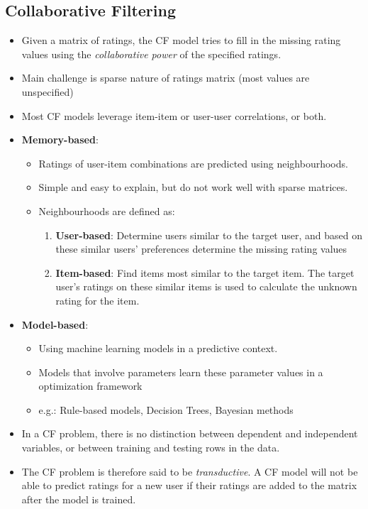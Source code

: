 \documentclass{article}
\begin{document}
\subsection{Collaborative Filtering}
\begin{itemize}
    \item Given a matrix of ratings, the CF model tries to fill in the missing rating values using the \textit{collaborative power} of the specified ratings. 
    
    \item Main challenge is sparse nature of ratings matrix (most values are unspecified)
    
    \item Most CF models leverage item-item or user-user correlations, or both.
    
    \item \textbf{Memory-based}: 
    \begin{itemize}
        \item Ratings of user-item combinations are predicted using neighbourhoods. 
        
        \item Simple and easy to explain, but do not work well with sparse matrices. 
        
        \item Neighbourhoods are defined as:
        \begin{enumerate}
            \item \textbf{User-based}: Determine users similar to the target user, and based on these similar users' preferences determine the missing rating values
            
            \item \textbf{Item-based}: Find items most similar to the target item. The target user's ratings on these similar items is used to calculate the unknown rating for the item. 
        \end{enumerate}
    \end{itemize} 

    \item \textbf{Model-based}:
    \begin{itemize}
        \item Using machine learning models in a predictive context. 
        
        \item Models that involve parameters learn these parameter values in a optimization framework
        
        \item e.g.: Rule-based models, Decision Trees, Bayesian methods
    \end{itemize}
    
    \item In a CF problem, there is no distinction between dependent and independent variables, or between training and testing rows in the data.
    
    \item The CF problem is therefore said to be \textit{transductive}. A CF model will not be able to predict ratings for a new user if their ratings are added to the matrix after the model is trained. 
\end{itemize}
\end{document}
